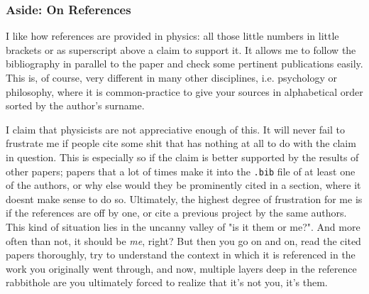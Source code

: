 \subsubsection{Aside: On References}
I like how references are provided in physics: all those little numbers in
little brackets or as superscript above a claim to support it. It allows me to
follow the bibliography in parallel to the paper and check some pertinent
publications easily. This is, of course, very different in many other
disciplines, i.e. psychology or philosophy, where it is common-practice to give
your sources in alphabetical order sorted by the author's surname.

I claim that physicists are not appreciative enough of this. It will never fail
to frustrate me if people cite some shit that has nothing at all to do with the
claim in question. This is especially so if the claim is better supported by
the results of other papers; papers that a lot of times make it into the
\texttt{.bib} file of at least one of the authors, or why else would they be
prominently cited in a section, where it doesnt make sense to do so.
Ultimately, the highest degree of frustration for me is if the references are
off by one, or cite a previous project by the same authors. This kind of
situation lies in the uncanny valley of "is it them or me?". And more often
than not, it should be \emph{me}, right? But then you go on and on, read the
cited papers thoroughly, try to understand the context in which it is
referenced in the work you originally went through, and now, multiple layers
deep in the reference rabbithole are you ultimately forced to realize that it's
not you, it's them. 

